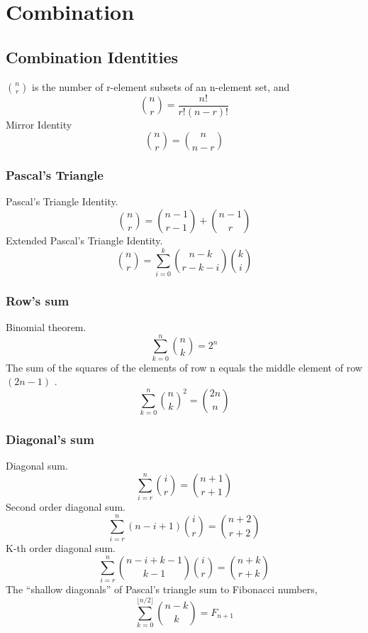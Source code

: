 \section{Combination}

\subsection{Combination Identities}
${n}\choose{r}$ is the number of r-element subsets of an n-element set\cite{comb1}, and
\begin{equation}
{{n}\choose{r}} = \frac{n!}{r!(n-r)!}
\end{equation}
Mirror Identity
\begin{equation}
{{n}\choose{r}} = {{n}\choose{n-r}}
\end{equation}

\subsubsection{Pascal's Triangle}
Pascal's Triangle Identity\cite{comb1}.
\begin{equation}
{{n}\choose{r}} = {{n-1}\choose{r-1}} + {{n-1}\choose{r}}
\end{equation}
Extended Pascal's Triangle Identity\cite{comb1}.
\begin{equation}
{{n}\choose{r}} = \sum \limits_{i=0}^k{{{n-k}\choose{r-k-i}}{{k}\choose{i}}}
\end{equation}

\subsubsection{Row's sum}
Binomial theorem.
\begin{equation}
\sum \limits_{k=0}^n{{n}\choose{k}} = 2^n
\end{equation}
The sum of the squares of the elements of row n equals the middle element of row $(2n - 1)$ \cite{comb2}.
\begin{equation}
\sum \limits_{k=0}^n{{{n}\choose{k}}^2} = {{2n}\choose{n}}
\end{equation}

\subsubsection{Diagonal's sum}
Diagonal sum\cite{comb1}.
\begin{equation}
\sum \limits_{i=r}^n{{i}\choose{r}} = {{n+1}\choose{r+1}}
\end{equation}
Second order diagonal sum\cite{comb1}.
\begin{equation}
\sum \limits_{i=r}^n{(n-i+1){{i}\choose{r}}} = {{n+2}\choose{r+2}}
\end{equation}
K-th order diagonal sum\cite{comb1}.
\begin{equation}
\sum \limits_{i=r}^n{{{n-i+k-1}\choose{k-1}}{{i}\choose{r}}} = {{n+k}\choose{r+k}}
\end{equation}
The ``shallow diagonals'' of Pascal's triangle sum to Fibonacci numbers\cite{comb3},
\begin{equation}
\sum \limits_{k=0}^{\lfloor n/2 \rfloor}{{n-k}\choose{k}} = F_{n+1}
\end{equation}

